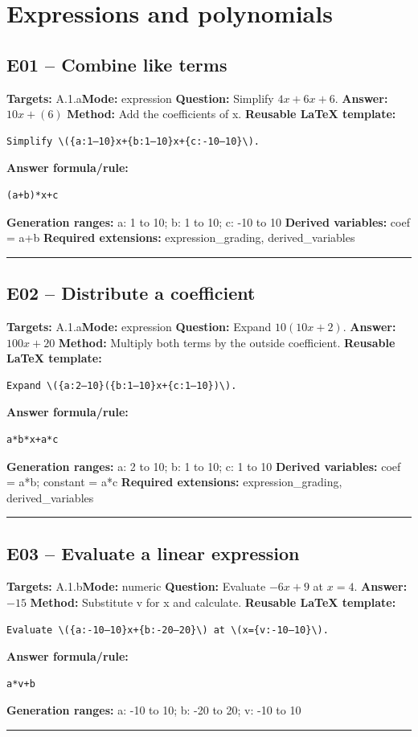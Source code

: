 \documentclass[11pt]{article}
\begin{document}
\section{Expressions and polynomials}
\subsection{E01 -- Combine like terms}
\textbf{Targets:} A.1.a\quad\textbf{Mode:} expression
\textbf{Question:} Simplify \(4x+6x+6\).
\textbf{Answer:} \(10x+(6)\)
\textbf{Method:} Add the coefficients of x.
\textbf{Reusable LaTeX template:}
\begin{verbatim}
Simplify \({a:1–10}x+{b:1–10}x+{c:-10–10}\).
\end{verbatim}
\textbf{Answer formula/rule:}
\begin{verbatim}
(a+b)*x+c
\end{verbatim}
\textbf{Generation ranges:} a: 1 to 10; b: 1 to 10; c: -10 to 10
\textbf{Derived variables:} coef = a+b
\textbf{Required extensions:} expression\_grading, derived\_variables
\medskip\hrule\medskip
\subsection{E02 -- Distribute a coefficient}
\textbf{Targets:} A.1.a\quad\textbf{Mode:} expression
\textbf{Question:} Expand \(10(10x+2)\).
\textbf{Answer:} \(100x+20\)
\textbf{Method:} Multiply both terms by the outside coefficient.
\textbf{Reusable LaTeX template:}
\begin{verbatim}
Expand \({a:2–10}({b:1–10}x+{c:1–10})\).
\end{verbatim}
\textbf{Answer formula/rule:}
\begin{verbatim}
a*b*x+a*c
\end{verbatim}
\textbf{Generation ranges:} a: 2 to 10; b: 1 to 10; c: 1 to 10
\textbf{Derived variables:} coef = a*b; constant = a*c
\textbf{Required extensions:} expression\_grading, derived\_variables
\medskip\hrule\medskip
\subsection{E03 -- Evaluate a linear expression}
\textbf{Targets:} A.1.b\quad\textbf{Mode:} numeric
\textbf{Question:} Evaluate \(-6x+9\) at \(x=4\).
\textbf{Answer:} \(-15\)
\textbf{Method:} Substitute v for x and calculate.
\textbf{Reusable LaTeX template:}
\begin{verbatim}
Evaluate \({a:-10–10}x+{b:-20–20}\) at \(x={v:-10–10}\).
\end{verbatim}
\textbf{Answer formula/rule:}
\begin{verbatim}
a*v+b
\end{verbatim}
\textbf{Generation ranges:} a: -10 to 10; b: -20 to 20; v: -10 to 10
\medskip\hrule\medskip
\end{document}
